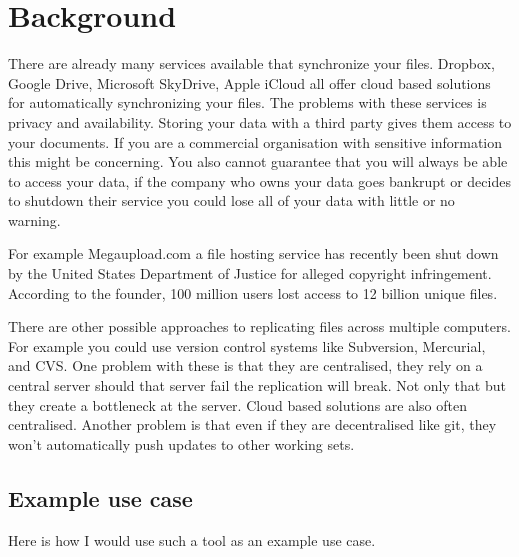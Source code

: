\documentclass[12pt]{article}
\begin{document}
\section{Background}
There are already many services available
that synchronize your
files. Dropbox, Google Drive, Microsoft SkyDrive, Apple iCloud
all offer cloud based solutions for automatically
synchronizing your files. The problems with these
services is privacy and availability. Storing your data with a
third party gives them access to your documents. If you
are a commercial organisation with sensitive information
this might be concerning. You also cannot guarantee
that you will always be able to access your data, if
the company who owns your data goes bankrupt or
decides to shutdown their service
you could lose all
of your data with little or no warning. 

For example Megaupload.com a file hosting service
has recently been shut down by the United States Department of
Justice for alleged copyright infringement. According to
the founder, 100 million users lost access to 12 billion
unique files\cite{dotcom-trial}.

There are other possible approaches to replicating files
across multiple computers. For example you could use
version control systems like Subversion, Mercurial, and
CVS. One problem with these is that they are
centralised, 
they rely on a central server should that
server fail the replication will break. Not only
that but they create a bottleneck at the server.
Cloud based solutions are also often centralised. 
Another problem is that even if they are decentralised
like git, they won't automatically push updates to other
working sets.



\subsection*{Example use case}
Here is how I would use such a tool as an example use case.
\end{document}

